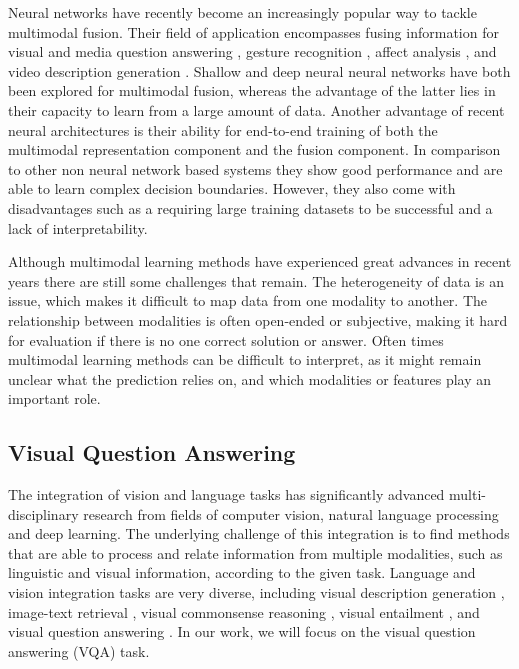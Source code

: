 \documentclass{article}
\begin{document}
Neural networks have recently become an increasingly popular way to tackle multimodal fusion. Their field of application encompasses fusing information for visual and media question answering \citep{gao2015are, malinowski2015ask, xu2016ask}, gesture recognition \citep{neverova2016moddrop}, affect analysis \citep{kahou2015EmoNets,nojavanasghari2016deep}, and video description generation \citep{jin2016video, venugopalan2016improving}. Shallow \citep{gao2015are} and deep \citep{nojavanasghari2016deep, venugopalan2016improving} neural neural networks have both been explored for multimodal fusion, whereas the advantage of the latter lies in their capacity to learn from a large amount of data. Another advantage of recent neural architectures is their ability for end-to-end training of both the multimodal representation component and the fusion component. In comparison to other non neural network based systems they show good performance and are able to learn complex decision boundaries. However, they also come with disadvantages such as a requiring large training datasets to be successful and a lack of interpretability. 

Although multimodal learning methods have experienced great advances in recent years there are still some challenges that remain. The heterogeneity of data is an issue, which makes it difficult to map data from one modality to another. The relationship between modalities is often open-ended or subjective, making it hard for evaluation if there is no one correct solution or answer. Often times multimodal learning methods can be difficult to interpret, as it might remain unclear what the prediction relies on, and which modalities or features play an important role.

\subsection{Visual Question Answering} \label{subsection:vqa}

The integration of vision and language tasks has significantly advanced multi-disciplinary research from fields of computer vision, natural language processing and deep learning. The underlying challenge of this integration is to find methods that are able to process and relate information from multiple modalities, such as linguistic and visual information, according to the given task. Language and vision integration tasks are very diverse, including visual description generation \citep{plummer2015vdg}, image-text retrieval \citep{wang2016retrieval}, visual commonsense reasoning \citep{zellers2019vcr}, visual entailment \citep{xie2019entailment}, and visual question answering \citep{antol2015vqa}. In our work, we will focus on the visual question answering (VQA) task.
\end{document}
